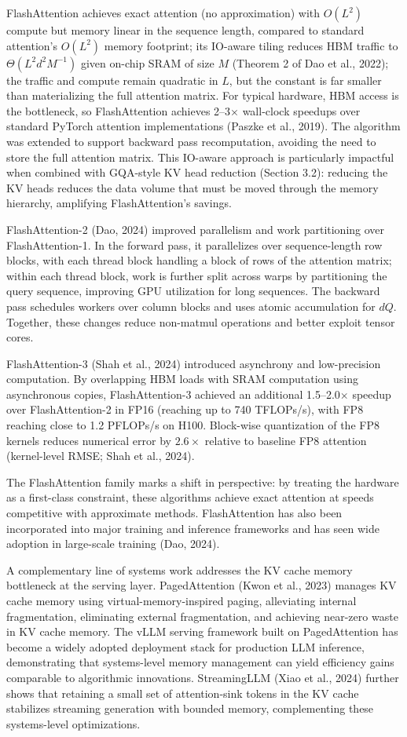 \documentclass[10pt,twocolumn]{article}
\begin{document}
FlashAttention achieves exact attention (no approximation) with $O(L^2)$ compute but memory linear in the sequence length, compared to standard attention's $O(L^2)$ memory footprint; its IO-aware tiling reduces HBM traffic to $\Theta(L^2 d^2 M^{-1})$ given on-chip SRAM of size $M$ (Theorem 2 of Dao et al., 2022); the traffic and compute remain quadratic in $L$, but the constant is far smaller than materializing the full attention matrix. For typical hardware, HBM access is the bottleneck, so FlashAttention achieves 2--3$\times$ wall-clock speedups over standard PyTorch attention implementations (Paszke et al., 2019). The algorithm was extended to support backward pass recomputation, avoiding the need to store the full attention matrix. This IO-aware approach is particularly impactful when combined with GQA-style KV head reduction (Section 3.2): reducing the KV heads reduces the data volume that must be moved through the memory hierarchy, amplifying FlashAttention's savings.

FlashAttention-2 (Dao, 2024) improved parallelism and work partitioning over FlashAttention-1. In the forward pass, it parallelizes over sequence-length row blocks, with each thread block handling a block of rows of the attention matrix; within each thread block, work is further split across warps by partitioning the query sequence, improving GPU utilization for long sequences. The backward pass schedules workers over column blocks and uses atomic accumulation for $dQ$. Together, these changes reduce non-matmul operations and better exploit tensor cores.

FlashAttention-3 (Shah et al., 2024) introduced asynchrony and low-precision computation. By overlapping HBM loads with SRAM computation using asynchronous copies, FlashAttention-3 achieved an additional 1.5--2.0$\times$ speedup over FlashAttention-2 in FP16 (reaching up to 740 TFLOPs/s), with FP8 reaching close to 1.2 PFLOPs/s on H100. Block-wise quantization of the FP8 kernels reduces numerical error by $2.6\times$ relative to baseline FP8 attention (kernel-level RMSE; Shah et al., 2024).

The FlashAttention family marks a shift in perspective: by treating the hardware as a first-class constraint, these algorithms achieve exact attention at speeds competitive with approximate methods. FlashAttention has also been incorporated into major training and inference frameworks and has seen wide adoption in large-scale training (Dao, 2024).

A complementary line of systems work addresses the KV cache memory bottleneck at the serving layer. PagedAttention (Kwon et al., 2023) manages KV cache memory using virtual-memory-inspired paging, alleviating internal fragmentation, eliminating external fragmentation, and achieving near-zero waste in KV cache memory. The vLLM serving framework built on PagedAttention has become a widely adopted deployment stack for production LLM inference, demonstrating that systems-level memory management can yield efficiency gains comparable to algorithmic innovations. StreamingLLM (Xiao et al., 2024) further shows that retaining a small set of attention-sink tokens in the KV cache stabilizes streaming generation with bounded memory, complementing these systems-level optimizations.
\end{document}
